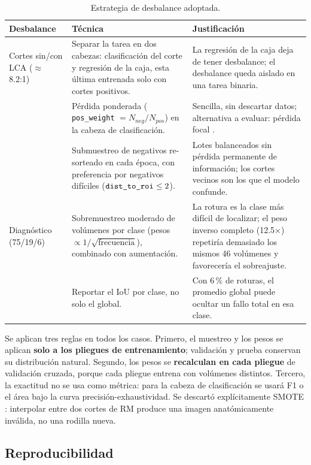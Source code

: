\documentclass[12pt,letterpaper]{article}
\newcommand{\code}[1]{\texttt{\hyphenchar\font=-1 #1}}
\begin{document}
\begin{table}[!htbp]
\centering
\small
\caption{Estrategia de desbalance adoptada.}
\label{tab:desbalance}
\begin{tabular}{p{2.6cm}p{5.6cm}p{6.0cm}}
\toprule
Desbalance & Técnica & Justificación \\
\midrule
Cortes sin/con LCA ($\approx$8.2:1) &
Separar la tarea en dos cabezas: clasificación del corte y regresión de la caja, esta última entrenada solo con cortes positivos. &
La regresión de la caja deja de tener desbalance; el desbalance queda aislado en una tarea binaria. \\
 & Pérdida ponderada (\code{pos\_weight} $=N_{neg}/N_{pos}$) en la cabeza de clasificación. &
Sencilla, sin descartar datos; alternativa a evaluar: pérdida focal \cite{lin2017focal}. \\
 & Submuestreo de negativos re-sorteado en cada época, con preferencia por negativos difíciles ($\code{dist\_to\_roi}\leq 2$). &
Lotes balanceados sin pérdida permanente de información; los cortes vecinos son los que el modelo confunde. \\
\midrule
Diagnóstico (75/19/6) &
Sobremuestreo moderado de volúmenes por clase (pesos $\propto 1/\sqrt{\text{frecuencia}}$), combinado con aumentación. &
La rotura es la clase más difícil de localizar; el peso inverso completo (12.5$\times$) repetiría demasiado los mismos 46 volúmenes y favorecería el sobreajuste. \\
 & Reportar el IoU por clase, no solo el global. &
Con 6\,\% de roturas, el promedio global puede ocultar un fallo total en esa clase. \\
\bottomrule
\end{tabular}
\end{table}

\noindent Se aplican tres reglas en todos los casos. Primero, el muestreo y los pesos se aplican \textbf{solo a los pliegues de entrenamiento}; validación y prueba conservan su distribución natural. Segundo, los pesos se \textbf{recalculan en cada pliegue} de validación cruzada, porque cada pliegue entrena con volúmenes distintos. Tercero, la exactitud no se usa como métrica: para la cabeza de clasificación se usará F1 o el área bajo la curva precisión-exhaustividad. Se descartó explícitamente SMOTE \cite{chawla2002smote}: interpolar entre dos cortes de RM produce una imagen anatómicamente inválida, no una rodilla nueva.

\subsection{Reproducibilidad}
\end{document}
